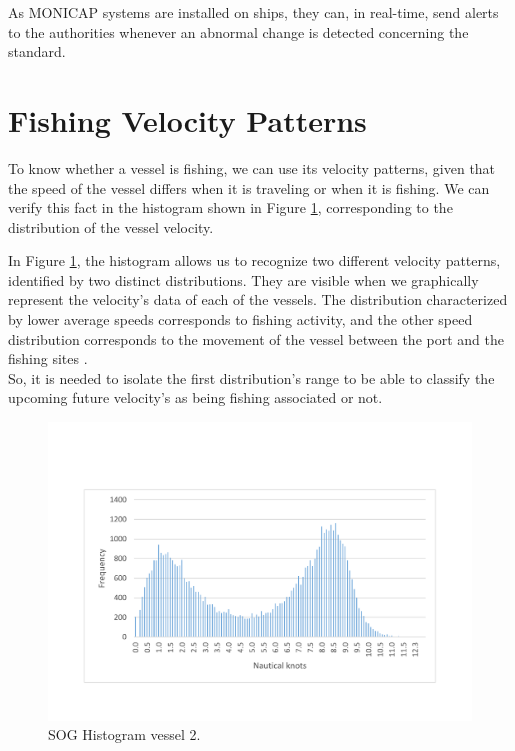 As MONICAP systems are installed on ships, they can, in real-time, send alerts to the authorities whenever an abnormal change is detected concerning the standard.


\section{Fishing Velocity Patterns} %
\label{sub:fishing_velocity_patterns}

To know whether a vessel is fishing, we can use its velocity patterns, given that the speed of the vessel differs when it is traveling or when it is fishing. We can verify this fact in the histogram shown in Figure \ref{fig:histogram_vessel2}, corresponding to the distribution of the vessel velocity.

In Figure \ref{fig:histogram_vessel2}, the histogram allows us to recognize two different velocity patterns, identified by two distinct distributions. They are visible when we graphically represent the velocity's data of each of the vessels. The distribution characterized by lower average speeds corresponds to fishing activity, and the other speed distribution corresponds to the movement of the vessel between the port and the fishing sites \cite{MappingFishing}. \\
So, it is needed to isolate the first distribution's range to be able to classify the upcoming future velocity's as being fishing associated or not.
\begin{figure}[H]
\centering
\includegraphics[trim=0 50 0 50, width=0.8\linewidth]{Chapters/img/hist_vessel2.pdf}
\caption{SOG Histogram vessel 2.}
\label{fig:histogram_vessel2}
\end{figure}


